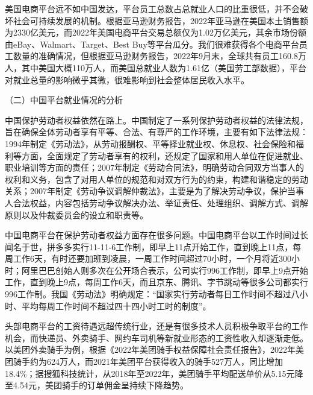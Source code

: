 \documentclass[12pt,twoside,utf8]{ctexart}
\begin{document}
美国电商平台远不如中国发达，平台员工总数占总就业人口的比重很低，并不会破坏社会可持续发展的机制。根据亚马逊财务报告，2022年亚马逊在美国本土销售额为2330亿美元，而2022年美国电商平台交易总额仅为1.02万亿美元，其余市场份额由eBay、Walmart、Target、Best Buy等平台瓜分。我们很难获得各个电商平台员工数量的准确情况，但根据亚马逊财务报告，2022年9月末，全球共有员工160.8万人，其中美国大概110万人，而美国总就业人数为1.61亿（美国劳工部数据），平台对就业总量的影响微乎其微，很难影响到社会整体居民收入水平。

（二）中国平台就业情况的分析

中国保护劳动者权益依然在路上。中国制定了一系列保护劳动者权益的法律法规，旨在确保全体劳动者享有平等、合法、有尊严的工作环境，主要有如下法律法规：1994年制定《劳动法》，从劳动报酬权、平等择业就业权、休息权、社会保险和福利等方面，全面规定了劳动者享有的权利，还规定了国家和用人单位在促进就业、职业培训等方面的责任；2007年制定《劳动合同法》，明确劳动合同双方当事人的权利和义务，包含了对用人单位的规范和对双方行为的约束，构建和谐稳定的劳动关系；2007年制定《劳动争议调解仲裁法》，主要是为了解决劳动争议，保护当事人合法权益，内容包括劳动争议解决办法、举证责任、处理组织、调解方式、调解原则以及仲裁委员会的设立和职责等。

中国电商平台在保护劳动者权益方面存在很多问题。中国电商平台以工作时间过长闻名于世，拼多多实行11-11-6工作制，即早上11点开始工作，直到晚上11点，每周工作6天，有时还要加班到凌晨，一周工作时间超过70小时，一个月将近300小时；阿里巴巴创始人则多次在公开场合表示，公司实行996工作制，即早上9点开始工作，直到晚上9点，每周工作6天，而且京东、腾讯、字节跳动等很多公司都实行996工作制。我国《劳动法》明确规定：“国家实行劳动者每日工作时间不超过八小时、平均每周工作时间不超过四十四小时工时的制度”。

头部电商平台的工资待遇远超传统行业，还是有很多技术人员积极争取平台的工作机会，而快递员、外卖骑手、网约车司机等新就业形态的工资性收入却逐渐走低。以美团外卖骑手为例，根据《2022年美团骑手权益保障社会责任报告》，2022年美团骑手约为624万人，而2021年美团平台获得收入的骑手527万人，同比增加18.4\%；据搜狐科技统计，从2018年至2022年，美团骑手平均配送单价从5.15元降至4.54元，美团骑手的订单佣金呈持续下降趋势。
\end{document}

